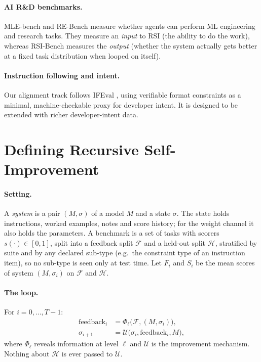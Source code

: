 \documentclass[11pt]{article}
\begin{document}
\paragraph{AI R\&D benchmarks.} MLE-bench \citep{chan2024mlebench} and RE-Bench \citep{wijk2024rebench} measure whether agents can perform ML engineering and research tasks. They measure an \emph{input} to RSI (the ability to do the work), whereas RSI-Bench measures the \emph{output} (whether the system actually gets better at a fixed task distribution when looped on itself).

\paragraph{Instruction following and intent.} Our alignment track follows IFEval \citep{zhou2023ifeval}, using verifiable format constraints as a minimal, machine-checkable proxy for developer intent. It is designed to be extended with richer developer-intent data.

\section{Defining Recursive Self-Improvement}
\label{sec:def}

\paragraph{Setting.} A \emph{system} is a pair $(M, \sigma)$ of a model $M$ and a state $\sigma$. The state holds instructions, worked examples, notes and score history; for the weight channel it also holds the parameters. A benchmark is a set of tasks with scorers $s(\cdot) \in [0,1]$, split into a feedback split $\mathcal{F}$ and a held-out split $\mathcal{H}$, stratified by suite and by any declared sub-type (e.g.\ the constraint type of an instruction item), so no sub-type is seen only at test time. Let $F_i$ and $S_i$ be the mean scores of system $(M, \sigma_i)$ on $\mathcal{F}$ and $\mathcal{H}$.

\paragraph{The loop.} For $i = 0,\dots,T-1$:
\begin{align*}
  \text{feedback}_i &= \Phi_\ell\big(\mathcal{F}, (M,\sigma_i)\big), \\
  \sigma_{i+1} &= \mathcal{U}\big(\sigma_i, \text{feedback}_i, M\big),
\end{align*}
where $\Phi_\ell$ reveals information at level $\ell$ and $\mathcal{U}$ is the improvement mechanism. Nothing about $\mathcal{H}$ is ever passed to $\mathcal{U}$.
\end{document}
